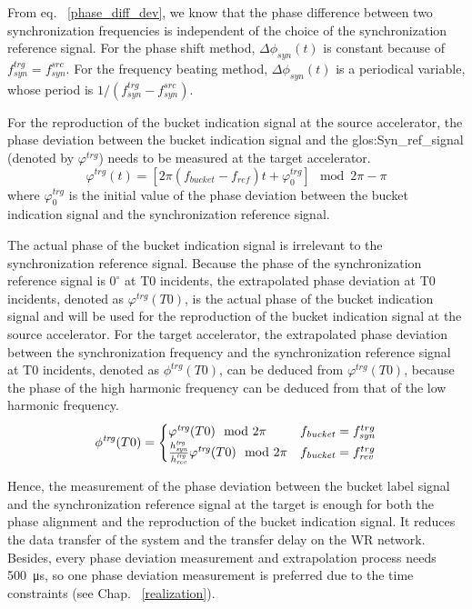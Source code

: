 From eq. ~\ref{phase_diff_dev}, we know that the phase difference between two synchronization frequencies is independent of the choice of the synchronization reference signal. For the phase shift method, $\Delta \phi_\mathit{syn}(t)$ is constant because of $f_\mathit{syn}^{trg}=f_\mathit{syn}^{src}$. For the frequency beating method, $\Delta \phi_\mathit{syn}(t)$ is a periodical variable, whose period is $1/(f_\mathit{syn}^{trg}-f_\mathit{syn}^{src})$. 

For the reproduction of the bucket indication signal at the source accelerator, the phase deviation between the bucket indication signal and the \gls{glos:Syn_ref_signal} (denoted by $\varphi^\mathit{trg}$) needs to be measured at the target accelerator.
\begin{equation}
\varphi^\mathit{trg}(t)= [2\pi(f_\mathit{bucket}-f_\mathit{ref})t+\varphi^\mathit{trg}_0] \mod 2\pi - \pi
\end{equation}
where $\varphi^\mathit{trg}_0$ is the initial value of the phase deviation between the bucket indication signal and the synchronization reference signal.

The actual phase of the bucket indication signal is irrelevant to the synchronization reference signal. Because the phase of the synchronization reference signal is $0^\circ$ at T0 incidents, the extrapolated phase deviation at T0 incidents, denoted as $\varphi^\mathit{trg}({T0})$, is the actual phase of the bucket indication signal and will be used for the reproduction of the bucket indication signal at the source accelerator. For the target accelerator, the extrapolated phase deviation between the synchronization frequency and the synchronization reference signal at T0 incidents, denoted as $\phi^\mathit{trg}({T0})$, can be deduced from $\varphi^\mathit{trg}({T0})$, because the phase of the high harmonic frequency can be deduced from that of the low harmonic frequency.
\begin{eqnarray}
\phi^\mathit{trg}({T0})=
\begin{cases}
\varphi^\mathit{trg}({T0}) \mod 2\pi &f_{\mathit{bucket}}=f_{\mathit{syn}}^{trg}\cr

\frac{h_\mathit{syn}^\mathit{trg}}{h_\mathit{rev}^\mathit{trg}}\varphi^\mathit{trg}({T0}) \mod 2\pi &f_{\mathit{bucket}}=f_{\mathit{rev}}^{trg}
\label{relation}
\end{cases}
\end{eqnarray}

Hence, the measurement of the phase deviation between the bucket label signal and the synchronization reference signal at the target is enough for both the phase alignment and the reproduction of the bucket indication signal. It reduces the data transfer of the system and the transfer delay on the WR network. Besides, every phase deviation measurement and extrapolation process needs \SI{500}{\us}, so one phase deviation measurement is preferred due to the time constraints (see Chap. ~\ref{realization}). 

